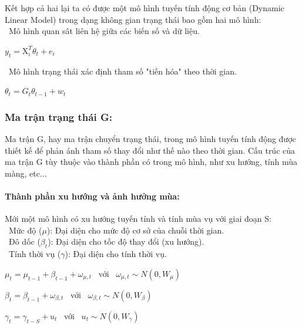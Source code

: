 \documentclass[conference]{IEEEtran}
\begin{document}
Kết hợp cả hai lại ta có được một mô hình tuyến tính động cơ bản (Dynamic Linear Model) trong dạng không gian trạng thái bao gồm hai mô hình:\\
\indent\textbullet\ Mô hình quan sât liên hệ giữa các biến số và dữ liệu.
\begin{center}
    \(y_{t} = \mathrm{X}_{i}^{T}\theta_{t} + e_{i}\)
\end{center}

\indent\textbullet\ Mô hình trạng thái xác định tham số "tiến hóa" theo thời gian.
\begin{center}
    \(\theta_{t} = G_{t}\theta_{t-1} + w_{t}\)
\end{center}
\subsubsection{Ma trận trạng thái G:}
Ma trận G, hay ma trận chuyển trạng thái, trong mô hình tuyến tính động được thiết kế để phản ánh tham số thay đổi như thế nào theo thời gian. Cấu trúc của ma trận G tùy thuộc vào thành phần có trong mô hình, như xu hướng, tính mùa màng, etc...
\paragraph{Thành phần xu hướng và ảnh hưởng mùa:}
Mới một mô hình có xu hướng tuyến tính và tính mùa vụ với giai đoạn S:\\
\indent\textbullet\ Mức độ (\(\mu\)): Đại diện cho mức độ cơ sở của chuỗi thời gian.\\
\indent\textbullet\ Đô dốc (\(\beta_{t}\)): Đại diện cho tốc độ thay đổi (xu hướng).\\
\indent\textbullet\ Tính thời vụ (\(\gamma\)): Đại diện cho tính thời vụ.
\begin{center}
    \(\mu_{t} = \mu_{t-1} + \beta_{t-1} + \omega_{\mu,t}\) \ với \ \(\omega_{\mu,t}\sim N(0,W_{\mu})\)
\end{center}

\begin{center}
    \(\beta_{t} = \beta_{t-1} + \omega_{\beta,t}\) \ với \ \(\omega_{\beta,t}\sim N(0,W_{\beta})\)
\end{center}

\begin{center}
    \(\gamma_{t} = \gamma_{t-S} + u_{t}\) \ với \ \(u_{t}\sim N(0,W_{\gamma})\)
\end{center}
\end{document}
